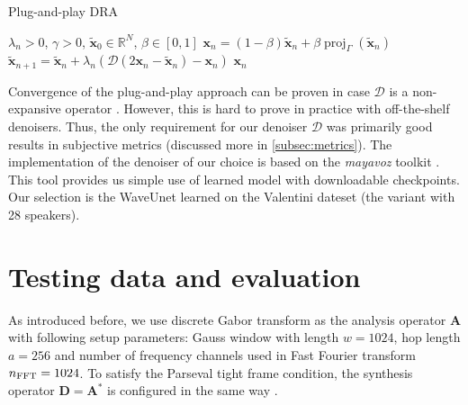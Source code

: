 \documentclass[conference]{IEEEtran}
\begin{document}
\begin{algorithm}
	\caption{Plug-and-play DRA}
	\begin{algorithmic}[1]\label{alg:pnp}
		\renewcommand{\algorithmicrequire}{\textbf{Input:}}
		\renewcommand{\algorithmicensure}{\textbf{Output:}}
		\REQUIRE $ \lambda_n > 0 $, $ \gamma>0 $, $ \mathbf{\widetilde{x}}_0 \in \mathbb{R}^{N} $, $\beta \in [0, 1]$
		\STATE %
		$\mathbf{x}_n= (1-\beta)\mathbf{\widetilde{x}}_n + \beta \operatorname{proj}_{\Gamma}(\mathbf{\widetilde{x}}_n) $ 
		\STATE $ \mathbf{\widetilde{x}}_{n+1} = \mathbf{\widetilde{x}}_n + \lambda_n \left( \mathcal{D} \left(2\mathbf{x}_n-\mathbf{\widetilde{x}}_n \right)-\mathbf{x}_n\right)$
		\ENDFOR
		\RETURN $\mathbf{x}_n$ 
	\end{algorithmic} 
\end{algorithm}


Convergence of the plug-and-play approach can be proven in case $\mathcal{D}$ is a non-expansive operator \cite{Chan2016}.
However, this is hard to prove in practice with off-the-shelf denoisers.
Thus, the only requirement for our denoiser $\mathcal{D}$ was primarily good results in subjective metrics
(discussed more in \ref{subsec:metrics}).
The implementation of the denoiser of our choice is based on the \textit{mayavoz} toolkit \cite{Shahul2023}.
This tool provides us simple use of learned model with downloadable checkpoints.
Our selection is the WaveUnet learned on the Valentini dateset \cite{ValentiniBotinhao2017} (the variant with 28 speakers).

\section{Testing data and evaluation}\label{sec:eval}

As introduced before, we use discrete Gabor transform as the analysis operator $\mathbf{A}$ with following setup parameters: Gauss window with length $w =1024 $, hop length $a = 256$ and number of frequency channels used in Fast Fourier transform %
$n_{\textup{FFT}} = 1024$.
To satisfy the Parseval tight frame condition, the synthesis operator $\mathbf{D} = \mathbf{A}^*$ is configured in the same way \cite{Mokry2020}.
\end{document}
